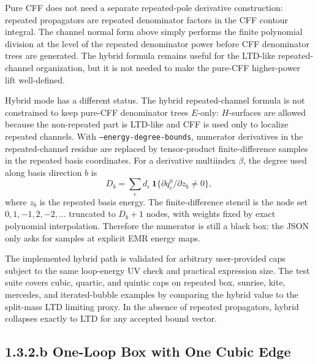 \documentclass[11pt,a4paper]{report}
\begin{document}
Pure CFF does not need a separate repeated-pole derivative construction:
repeated propagators are repeated denominator factors in the CFF contour
integral.  The channel normal form above simply performs the finite polynomial
division at the level of the repeated denominator power before CFF denominator
trees are generated.  The hybrid formula remains useful for the LTD-like
repeated-channel organization, but it is not needed to make the pure-CFF
higher-power lift well-defined.

Hybrid mode has a different status.  The hybrid repeated-channel formula is
not constrained to keep pure-CFF denominator trees \(E\)-only: \(H\)-surfaces
are allowed because the non-repeated part is LTD-like and CFF is used only to
localize repeated channels.  With \texttt{--energy-degree-bounds}, numerator
derivatives in the repeated-channel residue are replaced by tensor-product
finite-difference samples in the repeated basis coordinates.  For a derivative
multiindex \(\beta\), the degree used along basis direction \(b\) is
\[
  D_b=\sum_e d_e\,\mathbf 1\{\partial q_e^0/\partial z_b\ne0\},
\]
where \(z_b\) is the repeated basis energy.  The finite-difference stencil is
the node set \(0,1,-1,2,-2,\ldots\) truncated to \(D_b+1\) nodes, with weights
fixed by exact polynomial interpolation.  Therefore the numerator is still a
black box: the JSON only asks for samples at explicit EMR energy maps.

The implemented hybrid path is validated for arbitrary user-provided caps
subject to the same loop-energy UV check and practical expression size.  The
test suite covers cubic, quartic, and quintic caps on repeated box, sunrise,
kite, mercedes, and iterated-bubble examples by comparing the hybrid value to
the split-mass LTD limiting proxy.  In the absence of repeated propagators,
hybrid collapses exactly to LTD for any accepted bound vector.

\subsection*{1.3.2.b One-Loop Box with One Cubic Edge}
\end{document}
